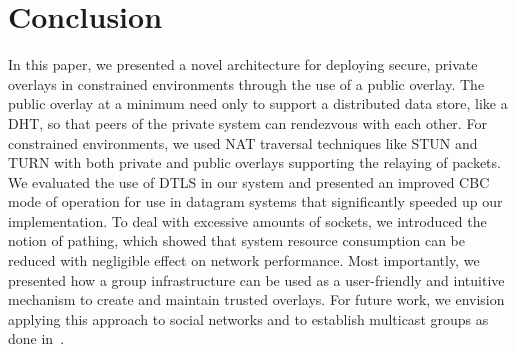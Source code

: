 \documentclass[conference]{IEEEtran}
\begin{document}
\section{Conclusion}
\label{conclusions}
In this paper, we presented a novel architecture for deploying secure, private
overlays in constrained environments through the use of a public overlay.
The public overlay at a minimum need only to support a distributed data store,
like a DHT, so that peers of the private system can rendezvous with each other.
For constrained environments, we used NAT traversal techniques like STUN and
TURN with both private and public overlays supporting the relaying of packets.
We evaluated the use of DTLS in our system and presented an improved CBC
mode of operation for use in datagram systems that significantly speeded up our
implementation.  To deal with excessive amounts of sockets, we introduced the
notion of pathing, which showed that system resource consumption can be reduced
with negligible effect on network performance.  Most importantly, we presented
how a group infrastructure can be used as a user-friendly and intuitive
mechanism to create and maintain trusted overlays.  For future work, we envision
applying this approach to social networks and to establish multicast groups as
done in~\cite{can}.



\suppressfloats
\end{document}
